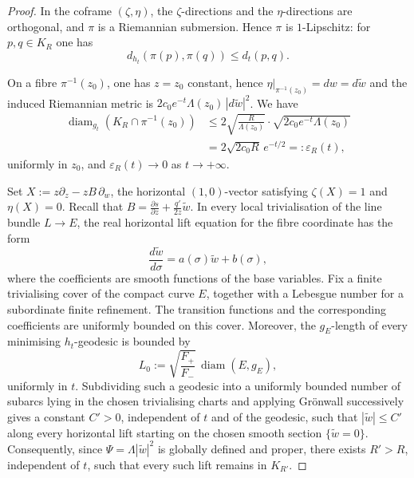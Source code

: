 \documentclass[12pt]{amsart}
\numberwithin{equation}{section}
\theoremstyle{remark}
\theoremstyle{definition}
\begin{document}
\begin{proof}
In the coframe $(\zeta,\eta)$, the $\zeta$-directions and the $\eta$-directions are orthogonal, and $\pi$ is a Riemannian submersion. Hence $\pi$ is $1$-Lipschitz: for $p,q\in K_R$ one has
$$ d_{h_t}(\pi(p),\pi(q)) \leq d_t(p,q). $$

On a fibre $\pi^{-1}(z_0)$, one has $z=z_0$ constant, hence $\eta\vert_{\pi^{-1}(z_0)}=dw=d\tilde w$ and the induced Riemannian metric is $2c_0e^{-t}\Lambda(z_0)\,|d\tilde w|^2$.
We have
\begin{align*}
\operatorname{diam}_{g_t} \left(K_R \cap \pi^{-1}(z_0)\right)
&\leq 2 \sqrt{\frac{R}{\Lambda(z_0)}} \cdot \sqrt{2c_0 e^{-t} \Lambda(z_0)} \\
&= 2\sqrt{2c_0R}\, e^{-t/2} =: \varepsilon_R(t),
\end{align*}
uniformly in $z_0$, and $\varepsilon_R(t)\to0$ as $t\to+\infty$.

Set $X:=z\partial_z-zB\,\partial_w$, the horizontal $(1,0)$-vector satisfying $\zeta(X)=1$ and $\eta(X)=0$. Recall that $B=\frac{\partial s}{\partial z}+\frac{q'}{2z}\tilde w$. In every local trivialisation of the line bundle $L\to E$, the real horizontal lift equation for the fibre coordinate has the form
$$\frac{d\tilde w}{d\sigma}=a(\sigma)\tilde w+b(\sigma),$$
where the coefficients are smooth functions of the base variables. Fix a finite trivialising cover of the compact curve $E$, together with a Lebesgue number for a subordinate finite refinement. The transition functions and the corresponding coefficients are uniformly bounded on this cover. Moreover, the $g_E$-length of every minimising $h_t$-geodesic is bounded by
$$L_0:=\sqrt{\frac{F_+}{F_-}}\,\operatorname{diam}(E,g_E),$$
uniformly in $t$. Subdividing such a geodesic into a uniformly bounded number of subarcs lying in the chosen trivialising charts and applying Gr\"onwall successively gives a constant $C'>0$, independent of $t$ and of the geodesic, such that $|\tilde w|\leq C'$ along every horizontal lift starting on the chosen smooth section $\{\tilde w=0\}$. Consequently, since $\Psi=\Lambda|\tilde w|^2$ is globally defined and proper, there exists $R'>R$, independent of $t$, such that every such lift remains in $K_{R'}$.


\end{proof}
\end{document}
